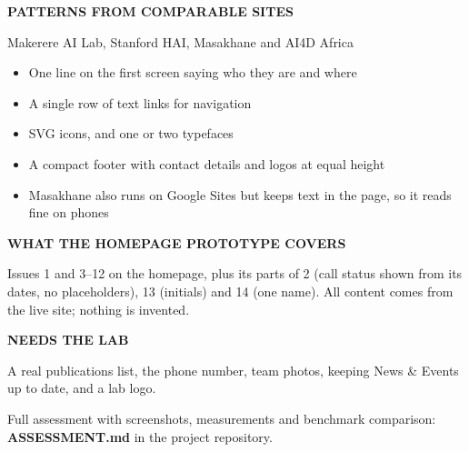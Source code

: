 \documentclass[10pt,a4paper]{article}
\begin{document}
\vspace{2pt}
\begin{tcbraster}[raster columns=2,raster column skip=4mm,raster equal height]
\begin{tcolorbox}[enhanced,colback=white,colframe=rule,boxrule=0.5pt,arc=3pt,left=8pt,right=8pt,top=7pt,bottom=7pt]
{\scriptsize\bfseries\color{brand}PATTERNS FROM COMPARABLE SITES}\par\vspace{4pt}
{\footnotesize\color{muted}Makerere AI Lab, Stanford HAI, Masakhane and AI4D Africa}\par\vspace{4pt}
\begin{itemize}[leftmargin=10pt,itemsep=1pt,topsep=0pt,label={\color{brand}\textbullet}]\footnotesize
  \item One line on the first screen saying who they are and where
  \item A single row of text links for navigation
  \item SVG icons, and one or two typefaces
  \item A compact footer with contact details and logos at equal height
  \item Masakhane also runs on Google Sites but keeps text in the page, so it reads fine on phones
\end{itemize}
\end{tcolorbox}
\begin{tcolorbox}[enhanced,colback=brandtint,colframe=brandtint,boxrule=0pt,arc=3pt,left=8pt,right=8pt,top=7pt,bottom=7pt]
{\scriptsize\bfseries\color{brand}WHAT THE HOMEPAGE PROTOTYPE COVERS}\par\vspace{4pt}
{\footnotesize Issues 1 and 3--12 on the homepage, plus its parts of 2 (call status shown from its dates, no
placeholders), 13 (initials) and 14 (one name). All content comes from the live site; nothing is invented.}\par\vspace{5pt}
{\scriptsize\bfseries\color{brand}NEEDS THE LAB}\par\vspace{3pt}
{\footnotesize A real publications list, the phone number, team photos, keeping News \& Events up to date, and a lab logo.}
\end{tcolorbox}
\end{tcbraster}

\vspace{6pt}
{\scriptsize\color{muted}Full assessment with screenshots, measurements and benchmark comparison: \textbf{ASSESSMENT.md} in the project repository.}
\end{document}
